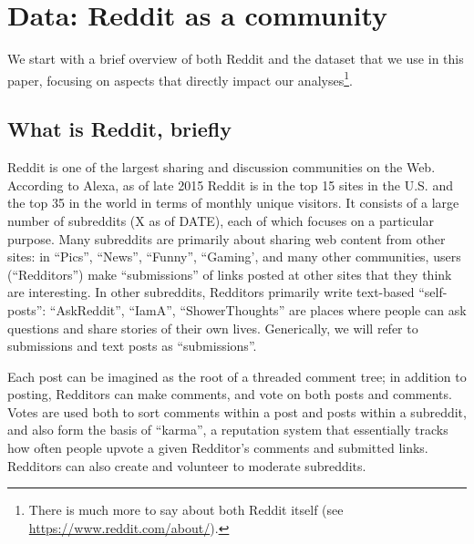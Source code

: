 \section{Data: Reddit as a community}

We start with a brief overview of both Reddit and the dataset that we use in this paper, focusing on aspects that directly impact our analyses\footnote{There is much more to say about both Reddit itself (see \url{https://www.reddit.com/about/}).}.

\subsection{What is Reddit, briefly}

Reddit is one of the largest sharing and discussion communities on the Web.  According to Alexa, as of late 2015 Reddit is in the top 15 sites in the U.S. and the top 35 in the world in terms of monthly unique visitors.  It consists of a large number of subreddits (X as of DATE), each of which focuses on a particular purpose.  Many subreddits are primarily about sharing web content from other sites: in ``Pics'', ``News'', ``Funny'', ``Gaming', and many other communities, users (``Redditors'') make ``submissions'' of links posted at other sites that they think are interesting.  In other subreddits, Redditors primarily write text-based ``self-posts'': ``AskReddit'', ``IamA'', ``ShowerThoughts'' are places where people can ask questions and share stories of their own lives.  Generically, we will refer to submissions and text posts as ``submissions''.  



Each post can be imagined as the root of a threaded comment tree; in addition to posting, Redditors can make comments, and vote on both posts and comments.  Votes are used both to sort comments within a post and posts within a subreddit, and also form the basis of ``karma'', a reputation system that essentially tracks how often people upvote a given Redditor's comments and submitted links.  Redditors can also create and volunteer to moderate subreddits.

